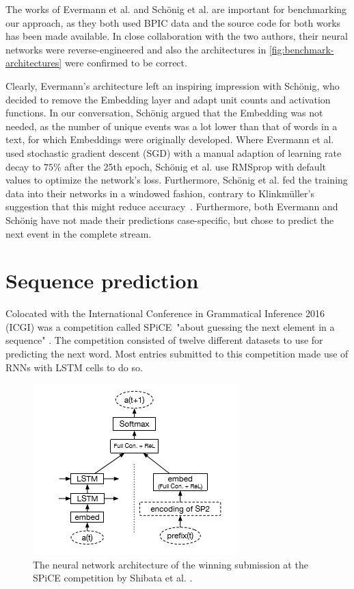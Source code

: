 The works of Evermann et al. and Schönig et al. are important for benchmarking our approach, as they both used BPIC data and the source code for both works has been made available. In close collaboration with the two authors, their neural networks were reverse-engineered and also the architectures in \autoref{fig:benchmark-architectures} were confirmed to be correct.

Clearly, Evermann's architecture left an inspiring impression with Schönig, who decided to remove the Embedding layer and adapt unit counts and activation functions. In our conversation, Schönig argued that the Embedding was not needed, as the number of unique events was a lot lower than that of words in a text, for which Embeddings were originally developed. Where Evermann et al. used stochastic gradient descent (SGD) with a manual adaption of learning rate decay to $75\%$ after the 25th epoch, Schönig et al. use RMSprop with default values to optimize the network's loss. Furthermore, Schönig et al. fed the training data into their networks in a windowed fashion, contrary to Klinkmüller's suggestion that this might reduce accuracy~\cite{klinkmuller2018reliablemonitoring}. Furthermore, both Evermann and Schönig have not made their predictions case-specific, but chose to predict the next event in the complete stream.

\section{Sequence prediction}
\label{sec:related-work-sequence-prediction}
Colocated with the International Conference in Grammatical Inference 2016 (ICGI) was a competition called SPiCE\ "about guessing the next element in a sequence" \cite{web:spice}. The competition consisted of twelve different datasets to use for predicting the next word. Most entries submitted to this competition made use of RNNs with LSTM cells to do so.\\

\begin{figure}
    \centering
    \includegraphics[height=.4\textwidth]{gfx/spice-winner-architecture.png}
    \caption{The neural network architecture of the winning submission at the SPiCE competition by Shibata et al. \cite{shibata2016bipartite}.}
    \label{fig:spice-winner-architecture}
\end{figure}


